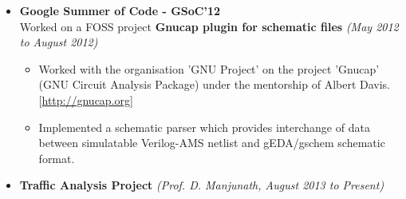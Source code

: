 \documentclass[a4paper,11pt]{article}
\newcommand{\isep}{-2 pt}
\begin{document}
\begin{itemize}
    \item \textbf{Google Summer of Code - GSoC'12} \\
\hspace{1mm} Worked on a FOSS project \textbf{Gnucap plugin for schematic files} \hfill \emph{(May 2012 to August 2012)} \\[-0.6cm]
    \begin{itemize}
        \item Worked with the organisation 'GNU Project' on the project 'Gnucap' (GNU Circuit Analysis Package) under the mentorship of Albert Davis. \hfill  [\url{http://gnucap.org}] \\[-0.6cm]
        \item Implemented a schematic parser which provides interchange of data between simulatable Verilog-AMS netlist and gEDA/gschem schematic format.
    \end{itemize}

    \item \textbf{Traffic Analysis Project} \hfill \emph{(Prof. D. Manjunath, August 2013 to Present)}

\begin{comment} %
\item \textbf{Robotic Sniffer Dog} \hfill \emph{(Guided by Prof. J. John and  D. Sharma, EE318 - Spring 2013)}
        \begin{itemize}
            \item Building a working prototype of a robotic control system which can be controlled from a considerable distance (using repeaters) through WLAN, Zigbee protocol relying on visual data from cameras.
            \item Consists of a sensor board which can detect explosive vapors in parts per billion.
        \end{itemize}
    \item \textbf{Processor design on FPGA}  \hfill \emph{(Guided by Prof. V. Singh, EE739 - Spring 2013)}
        \begin{itemize}
            \item Involves designing a specific processor architecture on FPGA
            \item Literature survey about available processor architectures, proposing a better one and demonstrating using FPGA
        \end{itemize}
\end{comment}


\end{itemize}
\end{document}
